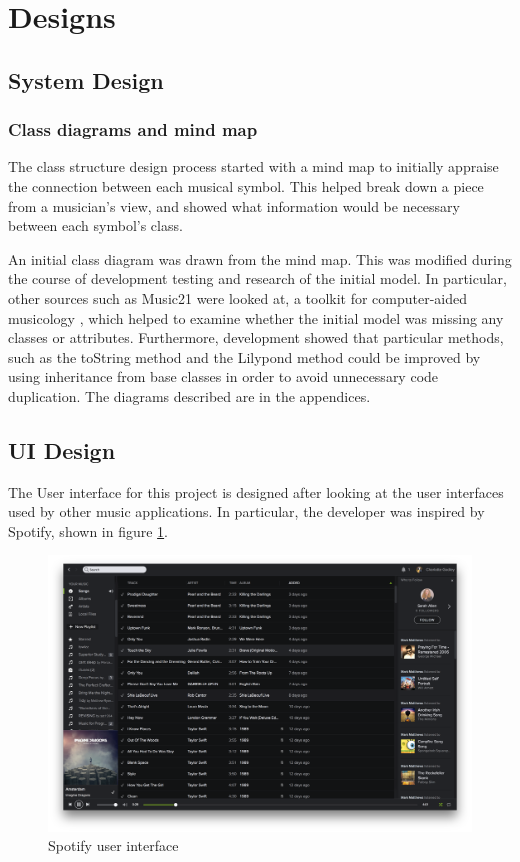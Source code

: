 \section{Designs}
\subsection{System Design}
\subsubsection{Class diagrams and mind map}
The class structure design process started with a mind map to initially appraise the connection between each musical symbol. This helped break down a piece from a musician's view, and showed what information would be necessary between each symbol's class.

An initial class diagram was drawn from the mind map. This was modified during the course of development testing and research of the initial model. In particular, other sources such as Music21 were looked at, a toolkit for computer-aided musicology \parencite{Music21}, which helped to examine whether the initial model was missing any classes or attributes. Furthermore, development showed that particular methods, such as the toString method and the Lilypond method could be improved by using inheritance from base classes in order to avoid unnecessary code duplication. The diagrams described are in the appendices. 
\subsection{UI Design}
The User interface for this project is designed after looking at the user interfaces used by other music applications. In particular, the developer was inspired by Spotify, shown in figure \ref{fig:spotify}.

\begin{figure}[h]
    \centering
    \includegraphics[width=\textwidth]{screen.png}
    \caption{Spotify user interface}
    \label{fig:spotify}
\end{figure}
